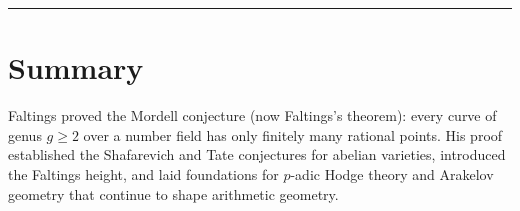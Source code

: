 \begin{center}\rule{0.5\linewidth}{0.5pt}\end{center}

\section*{Summary}

Faltings proved the Mordell conjecture (now Faltings's theorem): every curve of genus $g \geq 2$ over a number field has only finitely many rational points. His proof established the Shafarevich and Tate conjectures for abelian varieties, introduced the Faltings height, and laid foundations for $p$-adic Hodge theory and Arakelov geometry that continue to shape arithmetic geometry.
